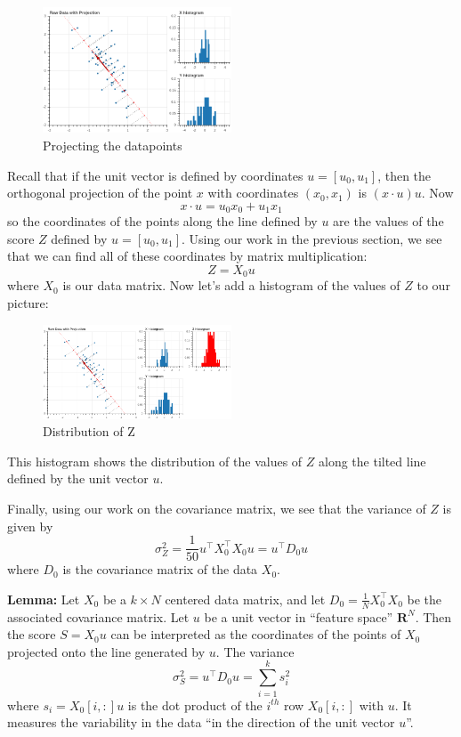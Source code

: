 \documentclass[
]{article}
\begin{document}
\begin{figure}
\hypertarget{fig:pcasimfig-2}{%
\centering
\includegraphics[width=0.5\textwidth,height=\textheight]{../img/PCAsimulated-3.png}
\caption{Projecting the datapoints}\label{fig:pcasimfig-2}
}
\end{figure}

Recall that if the unit vector is defined by coordinates
\(u=[u_0,u_1]\), then the orthogonal projection of the point \(x\) with
coordinates \((x_0,x_1)\) is \((x\cdot u)u\). Now \[
x\cdot u = u_0 x_0 + u_1 x_1
\] so the coordinates of the points along the line defined by \(u\) are
the values of the score \(Z\) defined by \(u=[u_0,u_1]\). Using our work
in the previous section, we see that we can find all of these
coordinates by matrix multiplication: \[
Z = X_0 u
\] where \(X_0\) is our data matrix. Now let's add a histogram of the
values of \(Z\) to our picture:

\begin{figure}
\hypertarget{fig:pcasimfig-3}{%
\centering
\includegraphics[width=0.5\textwidth,height=\textheight]{../img/PCAsimulated-4.png}
\caption{Distribution of Z}\label{fig:pcasimfig-3}
}
\end{figure}

This histogram shows the distribution of the values of \(Z\) along the
tilted line defined by the unit vector \(u\).

Finally, using our work on the covariance matrix, we see that the
variance of \(Z\) is given by \[
\sigma_{Z}^2 = \frac{1}{50}u^{\intercal}X_{0}^{\intercal}X_{0}u = u^{\intercal}D_{0}u
\] where \(D_{0}\) is the covariance matrix of the data \(X_{0}\).

\textbf{Lemma:} Let \(X_{0}\) be a \(k\times N\) centered data matrix,
and let \(D_{0}=\frac{1}{N}X_{0}^{\intercal}X_{0}\) be the associated
covariance matrix. Let \(u\) be a unit vector in ``feature space''
\(\mathbf{R}^{N}\). Then the score \(S=X_{0}u\) can be interpreted as
the coordinates of the points of \(X_{0}\) projected onto the line
generated by \(u\). The variance \[
\sigma^{2}_{S} = u^{\intercal}D_{0}u = \sum_{i=1}^{k} s_{i}^2
\] where \(s_{i} = X_{0}[i,:]u\) is the dot product of the \(i^{th}\)
row \(X_{0}[i,:]\) with \(u\). It measures the variability in the data
``in the direction of the unit vector \(u\)''.
\end{document}
